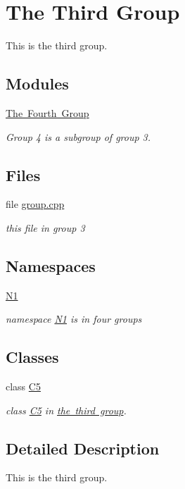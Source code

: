 \hypertarget{group__group3}{}\section{The Third Group}
\label{group__group3}


This is the third group.  


\subsection*{Modules}
\begin{DoxyCompactItemize}
\item 
\mbox{\hyperlink{group__group4}{The Fourth Group}}
\begin{DoxyCompactList}\small\item\em Group 4 is a subgroup of group 3. \end{DoxyCompactList}\end{DoxyCompactItemize}
\subsection*{Files}
\begin{DoxyCompactItemize}
\item 
file \mbox{\hyperlink{group_8cpp}{group.\+cpp}}
\begin{DoxyCompactList}\small\item\em this file in group 3 \end{DoxyCompactList}\end{DoxyCompactItemize}
\subsection*{Namespaces}
\begin{DoxyCompactItemize}
\item 
 \mbox{\hyperlink{namespace_n1}{N1}}
\begin{DoxyCompactList}\small\item\em namespace \mbox{\hyperlink{namespace_n1}{N1}} is in four groups \end{DoxyCompactList}\end{DoxyCompactItemize}
\subsection*{Classes}
\begin{DoxyCompactItemize}
\item 
class \mbox{\hyperlink{class_c5}{C5}}
\begin{DoxyCompactList}\small\item\em class \mbox{\hyperlink{class_c5}{C5}} in \mbox{\hyperlink{group__group3}{the third group}}. \end{DoxyCompactList}\end{DoxyCompactItemize}


\subsection{Detailed Description}
This is the third group. 

